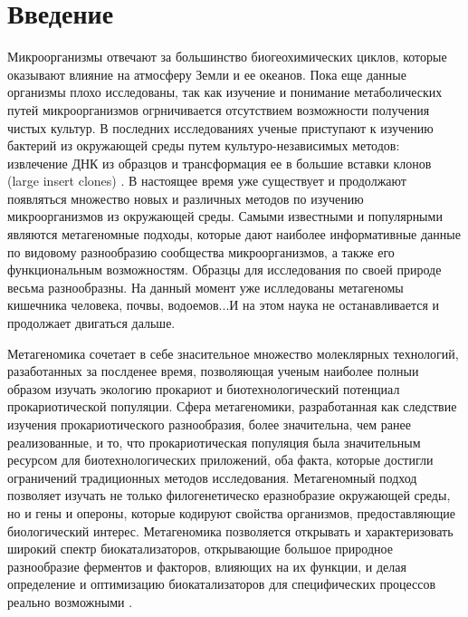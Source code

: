 \chapter{Введение} \label{introduction}

Микроорганизмы отвечают за большинство биогеохимических циклов, которые оказывают влияние на атмосферу Земли и ее океанов. Пока еще данные организмы плохо исследованы, так как изучение и понимание метаболических путей микроорганизмов огрничивается отсутствием возможности получения чистых культур. В последних исследованиях ученые приступают к изучению бактерий из окружающей среды путем культуро-независимых методов: извлечение ДНК из образцов и трансформация ее в большие вставки клонов (large insert clones) . В настоящее время уже существует и продолжают появляться множество новых и различных методов по изучению микроорганизмов из окружающей среды. Самыми известными и популярными являются метагеномные подходы, которые дают наиболее информативные данные по видовому разнообразию сообщества микроорганизмов, а также его функциональным возможностям. Образцы для исследования по своей природе весьма разнообразны. На данный момент уже ислледованы метагеномы кишечника человека, почвы, водоемов...И на этом наука не останавливается и продолжает двигаться дальше.

Метагеномика сочетает в себе знасительное множество молеклярных технологий, разаботанных за послденее время, позволяющая ученым наиболее полныи образом изучать экологию прокариот и биотехнологический потенциал прокариотической популяции. Сфера метагеномики, разработанная как следствие изучения прокариотического разнообразия, более значительна, чем ранее реализованные, и то, что прокариотическая популяция была значительным ресурсом для биотехнологических приложений, оба факта, которые достигли ограничений традиционных методов исследования. Метагеномный подход позволяет изучать не только филогенетическо еразнобразие окружающей среды, но и гены и опероны, которые кодируют свойства организмов, предоставляющие биологический интерес. Метагеномика позволяется открывать и характеризовать широкий спектр биокатализаторов, открывающие большое природное разнообразие ферментов и факторов, влияющих на их функции, и делая определение и оптимизацию биокатализаторов для специфических процессов  реально возможными \cite{Steele2005}. 

